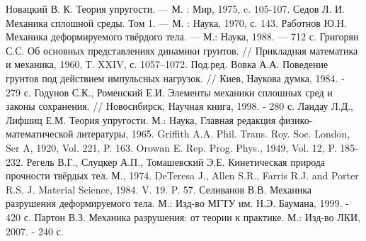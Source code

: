 \begin{thebibliography}{99}
Новацкий В. К. Теория упругости. — М. : Мир, 1975, c. 105-107.
Седов Л. И. Механика сплошной среды. Том 1. — М. : Наука, 1970, с. 143.
Работнов Ю.Н. Механика деформируемого твёрдого тела. — М.: Наука, 1988. — 712 с.
Григорян С.С. Об основных представлениях динамики грунтов. // Прикладная математика и механика, 1960, Т. XXIV, с. 1057--1072.
Под.ред. Вовка А.А. Поведение грунтов под действием импульсных нагрузок. // Киев, Наукова думка, 1984. - 279 с.
Годунов С.К., Роменский Е.И. Элементы механики сплошных сред и законы сохранения. // Новосибирск, Научная книга, 1998. - 280 с.
Ландау Л.Д., Лифшиц Е.М. Теория упругости. М.: Наука, Главная редакция физико-математической литературы, 1965.
Griffith A.A. Phil. Trans. Roy. Soc. London, Ser A, 1920, Vol. 221, P. 163.
 Orowan E. Rep. Prog. Phys., 1949, Vol. 12, P. 185-232.
Регель В.Г., Слуцкер А.П., Томашевский Э.Е. Кинетическая природа прочности твёрдых тел. М., 1974.
DeTeresa J., Allen S.R., Farris R.J. and Porter R.S. J. Material Science, 1984. V. 19. P. 57.
Селиванов В.В. Механика разрушения деформируемого тела. М.: Изд-во МГТУ им. Н.Э. Баумана, 1999. - 420 с.
Партон В.З. Механика разрушения: от теории к практике. М.: Изд-во ЛКИ, 2007. - 240 с.


\end{thebibliography}
